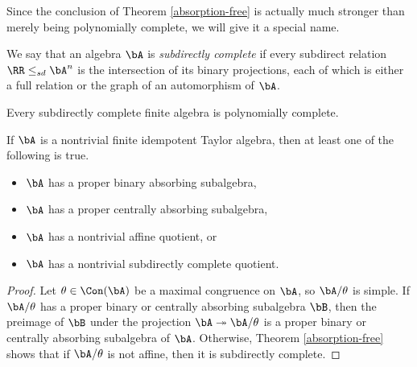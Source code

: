 Since the conclusion of Theorem \ref{absorption-free} is actually much stronger than merely being polynomially complete, we will give it a special name.

\begin{defn}\label{defn-subdirectly-complete} We say that an algebra $\bA$ is \emph{subdirectly complete} if every subdirect relation $\RR \le_{sd} \bA^n$ is the intersection of its binary projections, each of which is either a full relation or the graph of an automorphism of $\bA$.
\end{defn}

\begin{prop} Every subdirectly complete finite algebra is polynomially complete.
\end{prop}

\begin{cor}\label{zhuk-four-cases} If $\bA$ is a nontrivial finite idempotent Taylor algebra, then at least one of the following is true.
\begin{itemize}
\item $\bA$ has a proper binary absorbing subalgebra,
\item $\bA$ has a proper centrally absorbing subalgebra,
\item $\bA$ has a nontrivial affine quotient, or
\item $\bA$ has a nontrivial subdirectly complete quotient.
\end{itemize}
\end{cor}
\begin{proof} Let $\theta \in \Con(\bA)$ be a maximal congruence on $\bA$, so $\bA/\theta$ is simple. If $\bA/\theta$ has a proper binary or centrally absorbing subalgebra $\bB$, then the preimage of $\bB$ under the projection $\bA \twoheadrightarrow \bA/\theta$ is a proper binary or centrally absorbing subalgebra of $\bA$. Otherwise, Theorem \ref{absorption-free} shows that if $\bA/\theta$ is not affine, then it is subdirectly complete.
\end{proof}

